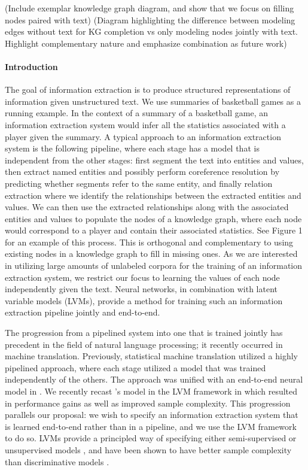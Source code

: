 \documentclass[11pt]{article}
\begin{document}
(Include exemplar knowledge graph diagram, and show that we focus on filling nodes paired with text)
(Diagram highlighting the difference between modeling edges without text for KG completion
vs only modeling nodes jointly with text. Highlight complementary nature and emphasize
combination as future work)

\paragraph{Introduction}
The goal of information extraction is to produce structured representations of information
given unstructured text.
We use summaries of basketball games as a running example.
In the context of a summary of a basketball game, an information extraction system
would infer all the statistics associated with a player given the summary.
A typical approach to an information extraction system is the following pipeline,
where each stage has a model that is independent from the other stages:
first segment the text into entities and values,
then extract named entities and possibly perform
coreference resolution by predicting whether segments refer to the same entity, 
and finally relation extraction where we identify the relationships between the extracted
entities and values.
We can then use the extracted relationships along with the associated entities and values
to populate the nodes of a knowledge graph, where each node would
correspond to a player and contain their associated statistics.
See Figure 1 for an example of this process.
This is orthogonal and complementary to using existing nodes in a knowledge graph
to fill in missing ones.
As we are interested in utilizing large amounts of unlabeled corpora for 
the training of an information extraction system, we restrict our focus
to learning the values of each node independently given the text.
Neural networks, in combination with latent variable models (LVMs),
provide a method for training such an information extraction pipeline jointly
and end-to-end.

The progression from a pipelined system into one that is trained jointly
has precedent in the field of natural language processing;
it recently occurred in machine translation.
Previously, statistical machine translation utilized a highly pipelined approach,
where each stage utilized a model that was trained independently of the others.
The approach was unified with an end-to-end neural model in \citet{bahdanau2014mt}.
We recently recast \citet{bahdanau2014mt}'s model in the LVM framework in
\citet{deng2018attn} which resulted in performance gains as well as improved
sample complexity.
This progression parallels our proposal: we wish to specify an information
extraction system that is learned end-to-end rather than in a pipeline,
and we use the LVM framework to do so.
LVMs provide a principled way of specifying either semi-supervised or unsupervised models
\citep{kingma2014ssvae},
and have been shown to have better sample complexity than discriminative models
\citep{deng2018attn,ng2001discgen}.
\end{document}
